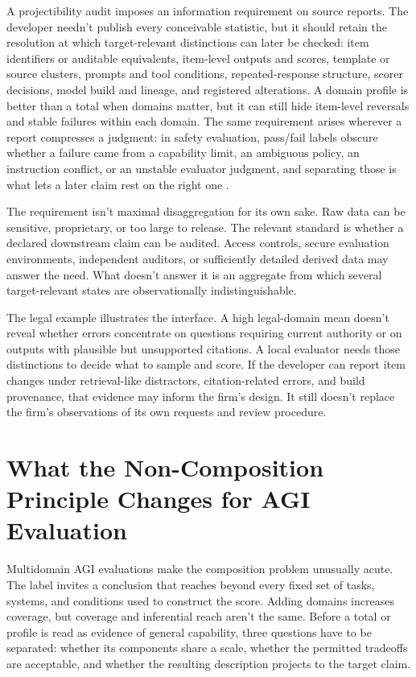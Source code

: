 \documentclass[12pt]{article}
\newif\ifanon
\begin{document}
A projectibility audit imposes an information requirement on source reports. The developer needn't publish every conceivable statistic, but it should retain the resolution at which target-relevant distinctions can later be checked: item identifiers or auditable equivalents, item-level outputs and scores, template or source clusters, prompts and tool conditions, repeated-response structure, scorer decisions, model build and lineage, and registered alterations. A domain profile is better than a total when domains matter, but it can still hide item-level reversals and stable failures within each domain. The same requirement arises wherever a report compresses a judgment: in safety evaluation, pass/fail labels obscure whether a failure came from a capability limit, an ambiguous policy, an instruction conflict, or an unstable evaluator judgment, and separating those is what lets a later claim rest on the right one \ifanon\citep{anonSelfAdversarialPragmatics}\else\citep{reynolds2026adversarialpragmatics}\fi.

The requirement isn't maximal disaggregation for its own sake. Raw data can be sensitive, proprietary, or too large to release. The relevant standard is whether a declared downstream claim can be audited. Access controls, secure evaluation environments, independent auditors, or sufficiently detailed derived data may answer the need. What doesn't answer it is an aggregate from which several target-relevant states are observationally indistinguishable.

The legal example illustrates the interface. A high legal-domain mean doesn't reveal whether errors concentrate on questions requiring current authority or on outputs with plausible but unsupported citations. A local evaluator needs those distinctions to decide what to sample and score. If the developer can report item changes under retrieval-like distractors, citation-related errors, and build provenance, that evidence may inform the firm's design. It still doesn't replace the firm's observations of its own requests and review procedure.

\section{What the Non-Composition Principle Changes for AGI Evaluation}\label{sec:agi}

Multidomain AGI evaluations make the composition problem unusually acute. The label  invites a conclusion that reaches beyond every fixed set of tasks, systems, and conditions used to construct the score. Adding domains increases coverage, but coverage and inferential reach aren't the same. Before a total or profile is read as evidence of general capability, three questions have to be separated: whether its components share a scale, whether the permitted tradeoffs are acceptable, and whether the resulting description projects to the target claim.
\end{document}
